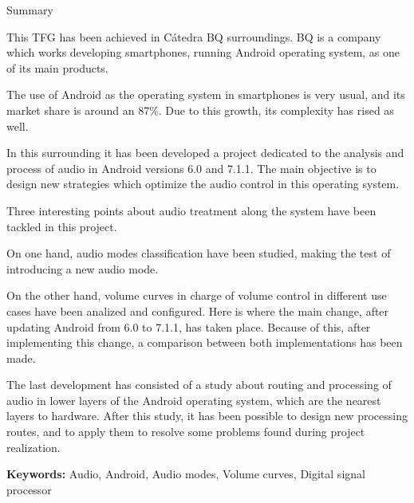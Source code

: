 \begin{center}
\Large{Summary}
\end{center}

\bigskip

This \gls{TFG} has been achieved in Cátedra BQ surroundings. BQ is a company which works developing smartphones, running Android operating system, as one of its main products.

The use of Android as the operating system in smartphones is very usual, and its market share is around an 87\%. Due to this growth, its complexity has rised as well.

In this surrounding it has been developed a project dedicated to the analysis and process of audio in Android versions 6.0 and 7.1.1. The main objective is to design new strategies which optimize the audio control in this operating system.

Three interesting points about audio treatment along the system have been tackled in this project.

On one hand, audio modes classification have been studied, making the test of introducing a new audio mode.

On the other hand, volume curves in charge of volume control in different use cases have been analized and configured. Here is where the main change, after updating Android from 6.0 to 7.1.1, has taken place. Because of this, after implementing this change, a comparison between both implementations has been made.

The last development has consisted of a study about routing and processing of audio in lower layers of the Android operating system, which are the nearest layers to hardware. After this study, it has been possible to design new processing routes, and to apply them to resolve some problems found during project realization.


\bigskip
\bigskip
\bigskip
\bigskip
\bigskip

\textbf{Keywords:} Audio, Android, Audio modes, Volume curves, Digital signal processor
